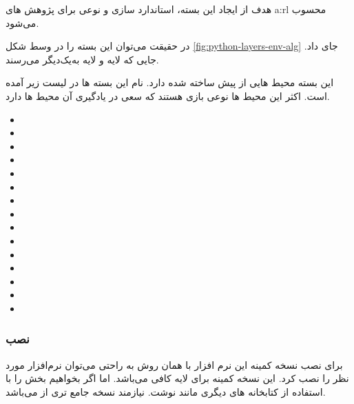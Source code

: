 هدف از ایجاد این بسته، استاندارد سازی 
و نوعی 
برای پژوهش های 
\gls*{a:rl}
محسوب می‌شود.\cite{medgyminstall}

در حقیقت می‌توان این بسته را در وسط شکل
\ref{fig:python-layers-env-alg}
جای‌ داد. جایی که لایه 
و لایه 
به‌یک‌دیگر می‌رسند. 

این بسته محیط هایی از پیش ساخته شده دارد. نام این بسته ها در لیست زیر
آمده است. 
اکثر این محیط ها نوعی بازی هستند که 
سعی در یادگیری آن محیط ها دارد.


\begin{multicols}{2}\scriptsize{}
	\begin{itemize}
		\item {}
		\item {}
		\item {}
		\item {}
		\item {}
		\item {}
		\item {}
		\item {}
		\item {}
		\item {}
		\item {}
		\item {}
		\item {}
		\item {}
		\item {}
	\end{itemize}
\end{multicols}



\subsubsection{نصب}
برای نصب نسخه کمینه این نرم افزار با همان روش  به راحتی می‌توان نرم‌افزار مورد نظر را نصب کرد.
\cite{git/gym}
این نسخه کمینه برای لایه 
کافی می‌باشد. اما اگر بخواهیم بخش  را با استفاده از کتابخانه های دیگری مانند  نوشت. نیازمند نسخه جامع تری از  می‌باشد.

